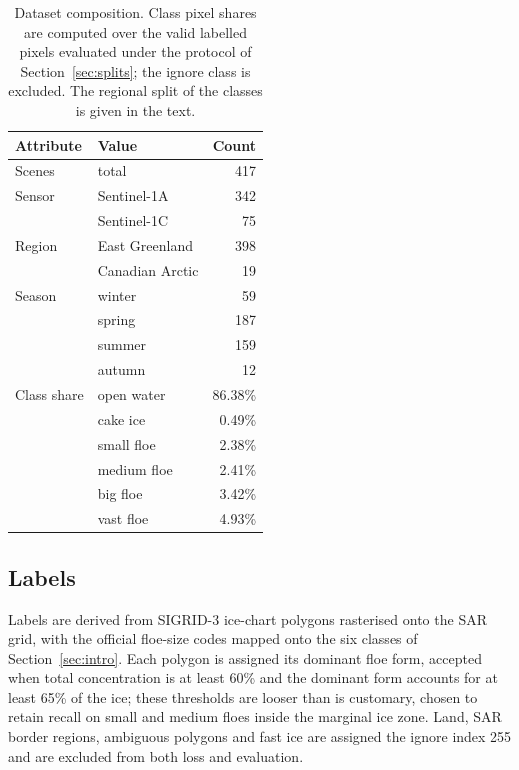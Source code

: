 \documentclass[preprint,12pt,authoryear]{elsarticle}
\begin{document}
\begin{table}[t]
\centering
\caption{Dataset composition. Class pixel shares are computed over the valid
labelled pixels evaluated under the protocol of Section~\ref{sec:splits}; the
ignore class is excluded. The regional split of the classes is given in the
text.}
\label{tab:dataset}
\begin{tabular}{llr}
\toprule
Attribute & Value & Count \\
\midrule
Scenes        & total                            & 417 \\
Sensor        & Sentinel-1A                      & 342 \\
              & Sentinel-1C                      & 75 \\
Region        & East Greenland                   & 398 \\
              & Canadian Arctic                  & 19 \\
Season        & winter                           & 59 \\
              & spring                           & 187 \\
              & summer                           & 159 \\
              & autumn                           & 12 \\
\midrule
Class share   & open water                       & 86.38\% \\
              & cake ice                         & 0.49\% \\
              & small floe                       & 2.38\% \\
              & medium floe                      & 2.41\% \\
              & big floe                         & 3.42\% \\
              & vast floe                        & 4.93\% \\
\bottomrule
\end{tabular}
\end{table}

\subsection{Labels}

Labels are derived from SIGRID-3 ice-chart polygons \citep{jcomm2010sigrid3}
rasterised onto the SAR grid, with the official floe-size codes mapped onto the
six classes of Section~\ref{sec:intro}. Each polygon is assigned its dominant
floe form, accepted when total concentration is at least 60\% and the dominant
form accounts for at least 65\% of the ice; these thresholds are looser than is
customary, chosen to retain recall on small and medium floes inside the marginal
ice zone. Land, SAR border regions, ambiguous polygons and fast ice are assigned
the ignore index 255 and are excluded from both loss and evaluation.
\end{document}
